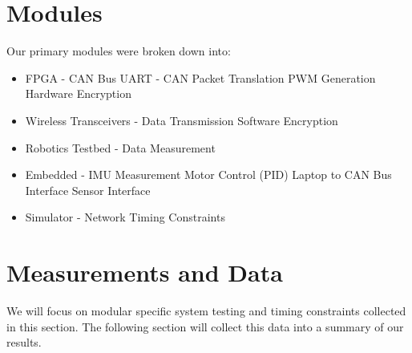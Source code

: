 \documentclass[a0,landscape]{a0poster}
\begin{document}
\begin{multicols}{3}
\section*{Modules}

Our primary modules were broken down into: 

\begin{multicols}{2}
\begin{itemize}
\item FPGA -
\subitem CAN Bus
\subitem UART - CAN Packet Translation
\subitem PWM Generation
\subitem Hardware Encryption
\item Wireless Transceivers -
\subitem Data Transmission
\subitem Software Encryption
\item Robotics Testbed -
\subitem Data Measurement
\item Embedded -
\subitem IMU Measurement
\subitem Motor Control (PID)
\subitem Laptop to CAN Bus Interface
\subitem Sensor Interface
\item Simulator -
\subitem Network Timing Constraints
\end{itemize}
\end{multicols}
	
\section*{Measurements and Data}

We will focus on modular specific system testing and timing constraints collected in this section. The following section will collect this data into a summary of our results.


\end{multicols}
\end{document}
